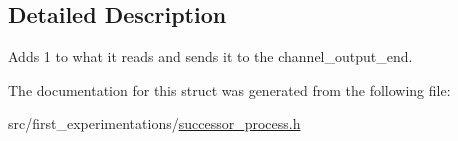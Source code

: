 \subsection{Detailed Description}
Adds 1 to what it reads and sends it to the channel\-\_\-output\-\_\-end. 

The documentation for this struct was generated from the following file\-:\begin{DoxyCompactItemize}
\item 
src/first\-\_\-experimentations/\hyperlink{successor__process_8h}{successor\-\_\-process.\-h}\end{DoxyCompactItemize}
